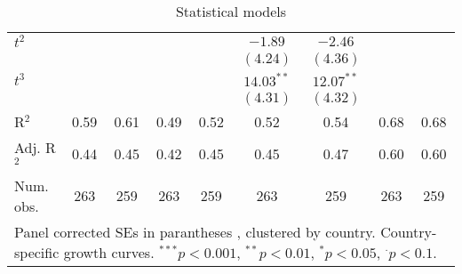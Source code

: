 \begin{table}
\begin{center}
\begin{tabular}{l c c c c c c c c }
$t^2$                          &              &               &                &                & $-1.89$        & $-2.46$        &                 &                 \\
                               &              &               &                &                & $(4.24)$       & $(4.36)$       &                 &                 \\
$t^3$                          &              &               &                &                & $14.03^{**}$   & $12.07^{**}$   &                 &                 \\
                               &              &               &                &                & $(4.31)$       & $(4.32)$       &                 &                 \\
\midrule
R$^2$                          & 0.59         & 0.61          & 0.49           & 0.52           & 0.52           & 0.54           & 0.68            & 0.68            \\
Adj. R$^2$                     & 0.44         & 0.45          & 0.42           & 0.45           & 0.45           & 0.47           & 0.60            & 0.60            \\
Num. obs.                      & 263          & 259           & 263            & 259            & 263            & 259            & 263             & 259             \\
\bottomrule
\multicolumn{9}{l}{\scriptsize{Panel corrected SEs in parantheses \cite{Beck.1995}, clustered by country. Country-specific growth curves. $^{***}p<0.001$, $^{**}p<0.01$, $^*p<0.05$, $^{\cdot}p<0.1$.}}
\end{tabular}
\caption{Statistical models}
\label{table:coefficients}
\end{center}
\end{table}

